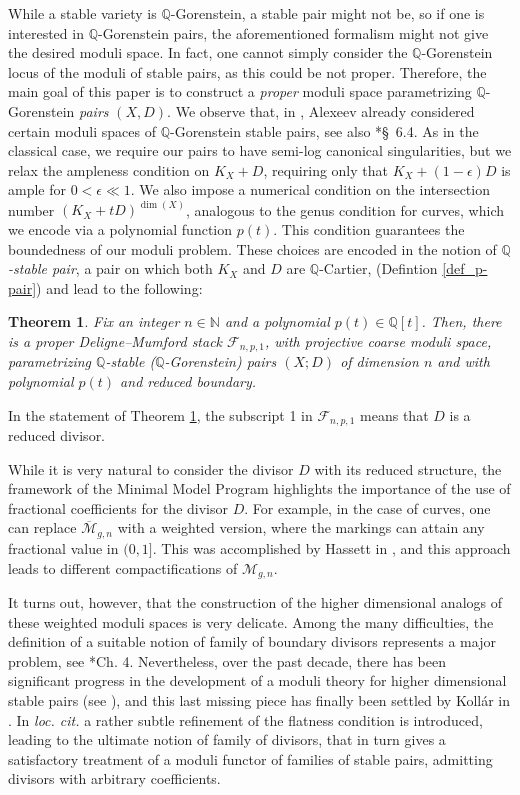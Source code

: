\documentclass{amsart}
\newcommand{\bQ}{\mathbb{Q}}
\newcommand{\sF}{\mathscr{F}}
\newcommand{\cM}{\mathcal{M}}
\newtheorem{theorem}{Theorem}[section]
\theoremstyle{definition}
\renewcommand{\qq}{\mathbb{Q}}
\begin{document}
While a stable variety is $\mathbb{Q}$-Gorenstein, a stable pair might not be, so if one is interested in $\mathbb{Q}$-Gorenstein pairs, the aforementioned formalism might not give the desired moduli space.
In fact, one cannot simply consider the $\qq$-Gorenstein locus of the moduli of stable pairs, as this could be not proper.
Therefore, the main goal of this paper is to construct a \emph{proper} moduli space parametrizing $\mathbb{Q}$-Gorenstein \emph{pairs} $(X,D)$.
We observe that, in \cite{Ale15}, Alexeev already considered certain moduli spaces of $\mathbb{Q}$-Gorenstein stable pairs, see also \cite{kol_new}*{\S~6.4}.
As in the classical case, we require our pairs to have semi-log canonical singularities, but we relax the ampleness condition on $K_X+D$,
requiring only that $K_X+(1-\epsilon)D$ is ample for $0< \epsilon \ll 1$.
We also impose a numerical condition on the intersection number $(K_X + tD)^{\dim(X)}$, analogous to the genus condition for curves, which we encode via a polynomial function $p(t)$.
This condition guarantees the boundedness of our moduli problem.
These choices are encoded in the notion of \emph{$\bQ$-stable pair}, a pair on which both $K_X$ and $D$ are $\bQ$-Cartier, (Defintion \ref{def_p-pair}) and lead to the following:
\begin{theorem} \label{thm intro 1}
Fix an integer $n\in \mathbb{N}$ and a polynomial $p(t) \in \mathbb{Q}[t]$. 
Then, there is a proper Deligne--Mumford stack $\sF_{n,p,1}$, with projective coarse moduli space, parametrizing $\bQ$-stable ($\bQ$-Gorenstein) pairs $(X;D)$ of dimension $n$ and with polynomial $p(t)$ and reduced boundary.
\end{theorem}

In the statement of Theorem \ref{thm intro 1}, the subscript 1 in $\sF_{n,p,1}$ means that $D$ is a reduced divisor.

While it is very natural to consider the divisor $D$ with its reduced structure, the framework of the Minimal Model Program highlights the importance of the use of fractional coefficients for the divisor $D$.
For example, in the case of curves, one can replace $\overline{\cM}_{g,n}$ with a weighted version, where the markings can attain any fractional value in $(0,1]$.
This was accomplished by Hassett in \cite{Has03}, and this approach leads to different compactifications of
$\cM_{g,n}$.

It turns out, however, that the construction of the higher dimensional analogs of these weighted moduli spaces is very delicate.
Among the many difficulties, the definition of a suitable notion of family of boundary divisors represents a major problem, see \cite{kol_new}*{Ch. 4}.
Nevertheless, over the past decade, there has been significant progress in the development of a moduli theory for higher dimensional stable pairs (see \cites{ Ale94, Kol13, kol08, HX13, KP17, kol_new, HMX }), and this last missing piece has finally been settled by Koll\'ar in \cite{kol19s}.
In \emph{loc. cit.} a rather subtle refinement of the flatness condition is introduced, leading to the ultimate notion of family of divisors, that in turn gives a satisfactory treatment of a moduli functor of families of stable pairs, admitting divisors with arbitrary coefficients.
\end{document}
